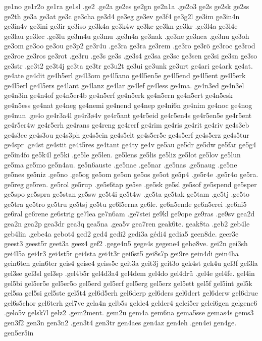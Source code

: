 ge1no
ge1r2o
ge1ra
ge1sl
.ge2
.ge2a
ge2es
ge2gn
ge2n1a
.ge2o3
ge2s
ge2sk
ge2ss
ge2th
ge3a
ge3at
ge3c
ge3cha
ge3d4
ge3eg
ge3ev
ge3f4
ge3g2l
ge3im
ge3in4n
ge3in4v
ge3ini
ge3ir
ge3iso
ge3k4a
ge3k4w
ge3ke
ge3kn
ge3kr
.ge3l4a
ge3l4e
ge3lau
ge3lec
.ge3lu
ge3m4u
ge3mu
.ge3n4a
ge3nak
.ge3ne
ge3nea
.ge3nu
ge3oh
ge3om
ge3oo
ge3ou
ge3p2
ge3r4u
.ge3ra
ge3ra
ge3rem
.ge3ro
ge3rö
ge3roc
ge3rod
ge3roe
ge3ros
ge3rot
.ge3ru
.ge3s
ge3s
.ge3s4
ge3sa
ge3sc
ge3sen
ge3si
ge3sn
ge3so
ge3str
.ge3t2
ge3t4j
ge3ta
ge3tr
ge3u2t
ge3ui
ge3unk
ge3urt
ge4ari
ge4ark
ge4at.
ge4ate
ge4dit
ge4h5erl
ge4l3om
ge4l5ano
ge4l5en5e
ge4l5end
ge4l5ent
ge4l5erk
ge4l5erl
ge4l5ers
ge4lant
ge4lanz
ge4lar
ge4lef
ge4less
ge4ma.
ge4n3ed
ge4n3el
ge4n3in
ge4n4of
ge4n5er4b
ge4n5erf
ge4n5erk
ge4n5ern
ge4n5ert
ge4n5esk
ge4n5ess
ge4nat
ge4neg
ge4nemi
ge4nend
ge4nep
ge4ni6n
ge4nim
ge4noc
ge4nog
ge4nun
.ge4o
ge4r3a4l
ge4r3ø4v
ge4r5ant
ge4r5eid
ge4r5en4s
ge4r5en5e
ge4r5ent
ge4r5er4w
ge4r5erh
ge4rans
ge4reng
ge4rerf
ge4rim
ge4ris
ge4rit
ge4riv
ge4s3eb
ge4s3ec
ge4s3ou
ge4s3ph
ge4s5ein
ge4s5elt
ge4s5er5e
ge4s5erf
ge4s5erz
ge4s5tur
ge4spr
.ge4st
ge4stit
ge4t5res
ge4tant
ge4ty
ge4v
ge5au
ge5dr
ge5dw
ge5far
ge5g4
ge5in4fo
ge5k4l
ge5ki
.ge5le
ge5len.
ge5lens
ge5lis
ge5liz
ge5lot
ge5lov
ge5lun
ge5ma
ge5mo
ge5n4au.
ge5n6auste
.ge5nae
.ge5nar
.ge5nas
.ge5naug
.ge5ne
ge5nes
ge5niz
.ge5no
.ge5og
ge5om
ge5on
ge5os
ge5ot
ge5p4
.ge5r4e
.ge5r4o
ge5ra.
ge5reg
ge5ren.
ge5rol
ge5rup
.ge5s6tap
ge5se
.ge5sk
ge5sl
ge5sof
ge5spend
ge5sper
ge5spo
ge5spra
ge5stan
ge5sw
ge5t4i
ge5t4w
.ge5ta
ge5tak
ge5tam
.ge5tj
.ge5to
ge5tra
ge5tro
ge5tru
ge5tsj
ge5tu
ge6l5erna
ge6le.
ge6n5ende
ge6n5erei
.ge6ni5
ge6ral
ge6rene
ge6strig
ge7lea
ge7n6am
.ge7stei
ge9kl
ge9ope
ge9ras
.ge9sv
gea2d
gea2n
gea2p
gea3dr
gea3q
gea5na
.gea5v
gea7ren
geak6te.
geak8ta
.geb2
geb4le
geb4lin
.gebe4a
gebot4
ged2
ged4
gedi2
gedi3a
gédi4
gedia5
geen8de.
geer3e
geest3
geest5r
geet3a
geez4
gef2
.gege4n5
gege4s
gegene4
gehø8ve.
gei2n
gei3sh
gei4l5a
gei4r3
gei4st5r
gei4sta
gei4t3r
gei6st5
gei8s7p
gei9re
gein4di
gein4ha
gein6ten
gein6ter
geis4
geise4
geiss5c
geit3a
geit3j
geit3o
gek4st
gek4u
gel3f
gel3la
gel3se
gel3sl
gel3sp
.gel4b5r
gel4d3a4
gel4dem
gel4do
gel4drü
.gel4e
gel4fe.
gel4in
gel5bi
gel5er5e
gel5er5o
gel5erd
gel5erf
gel5erg
gel5erz
gel5ett
gel5f
gel5int
gel5k
gel5sa
gel5si
gel5ste
gel5t4
gel6d5erh
gel6derp
gel6ders
gel6dert
gel6derw
gel6drue
gel6s5chor
gel6terh
gel7ve
gela4n
gelb5s
gelde4
gelder4
gelei5er
gelei6gen
gelgene6
.gelo5v
gelsk7l
gelz2
.gem2ment.
gem2u
gem4a
gem6na
gema5sse
gemas4s
gems3
gen3f2
gen3n
gen3n2
.gen3t4
gen3tr
gen4aes
gen4az
gen4eh
.gen4ei
gen4ge.
gen5er5in

